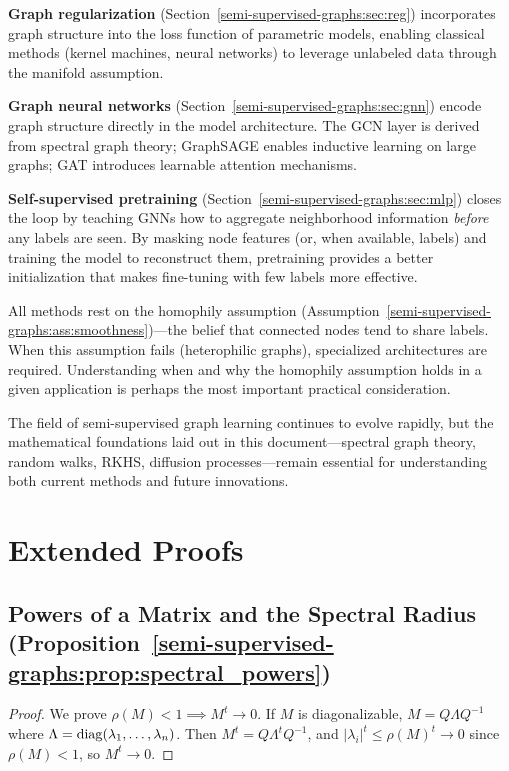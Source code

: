 \begin{notechapter}
\textbf{Graph regularization} (Section~\ref{semi-supervised-graphs:sec:reg}) incorporates graph
structure into the loss function of parametric models, enabling classical
methods (kernel machines, neural networks) to leverage unlabeled data through
the manifold assumption.

\textbf{Graph neural networks} (Section~\ref{semi-supervised-graphs:sec:gnn}) encode graph structure
directly in the model architecture. The GCN layer is derived from spectral
graph theory; GraphSAGE enables inductive learning on large graphs; GAT
introduces learnable attention mechanisms.

\textbf{Self-supervised pretraining} (Section~\ref{semi-supervised-graphs:sec:mlp}) closes the loop
by teaching GNNs how to aggregate neighborhood information \emph{before} any
labels are seen. By masking node features (or, when available, labels) and
training the model to reconstruct them, pretraining provides a better
initialization that makes fine-tuning with few labels more effective.

All methods rest on the homophily assumption
(Assumption~\ref{semi-supervised-graphs:ass:smoothness})---the belief that connected nodes tend to
share labels. When this assumption fails (heterophilic graphs), specialized
architectures are required. Understanding when and why the homophily assumption
holds in a given application is perhaps the most important practical
consideration.

The field of semi-supervised graph learning continues to evolve rapidly, but
the mathematical foundations laid out in this document---spectral graph theory,
random walks, RKHS, diffusion processes---remain essential for understanding
both current methods and future innovations.


\chapterappendix
\newpage
\section{Extended Proofs}
\label{semi-supervised-graphs:app:proofs}

\subsection{Powers of a Matrix and the Spectral Radius
  (Proposition~\ref{semi-supervised-graphs:prop:spectral_powers})}
\label{semi-supervised-graphs:app:spectral_radius}

\begin{proof}
We prove $\rho(M) < 1 \implies M^t \to 0$. If $M$ is diagonalizable,
$M = Q\Lambda Q^{-1}$ where $\Lambda = \operatorname{diag}(\lambda_1, \ldots, \lambda_n)$.
Then $M^t = Q\Lambda^t Q^{-1}$, and $|\lambda_i|^t \leq \rho(M)^t \to 0$ since
$\rho(M) < 1$, so $M^t \to 0$.


\end{proof}
\end{notechapter}
